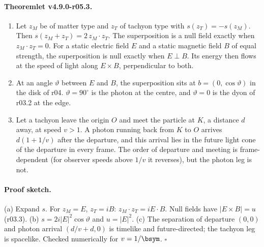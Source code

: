 \paragraph{Theoremlet v4.9.0-r05.3.}
\begin{enumerate}[leftmargin=2em]
\item[(a)] Let \(z_M\) be of matter type and \(z_T\) of tachyon type with \(s(z_T)=-s(z_M)\).  Then
\(s(z_M+z_T)=2\,z_M\cdot z_T\).  The superposition is a null field exactly when \(z_M\cdot z_T=0\).  For a static electric
field \(E\) and a static magnetic field \(B\) of equal strength, the superposition is null exactly when \(E\perp B\).  Its
energy then flows at the speed of light along \(E\times B\), perpendicular to both.
\item[(b)] At an angle \(\vartheta\) between \(E\) and \(B\), the superposition sits at \(b=(0,\cos\vartheta)\) in the disk of
r04.  \(\vartheta=90^\circ\) is the photon at the centre, and \(\vartheta=0\) is the dyon of r03.2 at the edge.
\item[(c)] Let a tachyon leave the origin \(O\) and meet the particle at \(K\), a distance \(d\) away, at speed \(v>1\).  A
photon running back from \(K\) to \(O\) arrives \(d(1+1/v)\) after the departure, and this arrival lies in the future light
cone of the departure in every frame.  The order of departure and meeting is frame-dependent (for observer speeds above
\(1/v\) it reverses), but the photon leg is not.
\end{enumerate}

\paragraph{Proof sketch.}
(a) Expand \(s\).  For \(z_M=E\), \(z_T=iB\): \(z_M\cdot z_T=iE\cdot B\).  Null fields have \(|E\times B|=u\) (r03.3).
(b) \(s=2i|E|^2\cos\vartheta\) and \(u=|E|^2\).  (c) The separation of departure \((0,0)\) and photon arrival
\((d/v+d,0)\) is timelike and future-directed; the tachyon leg is spacelike.  Checked numerically for \(v=1/\bsym\).
\(\square\)

